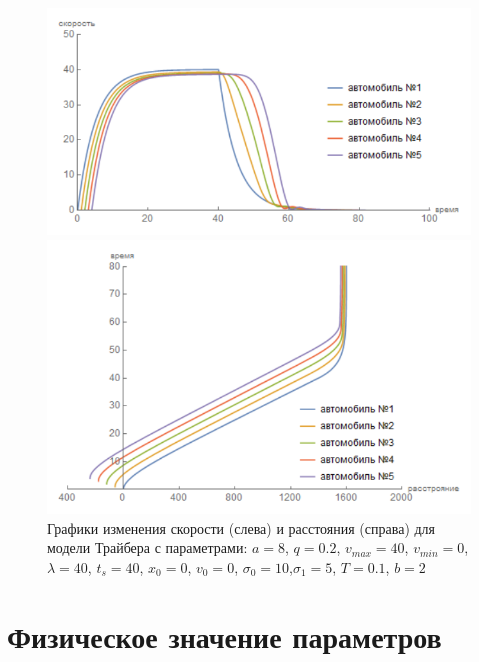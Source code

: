 \documentclass[12pt, a4paper]{extarticle}
\numberwithin{equation}{section}
\begin{document}
\begin{figure}[h!]
	\begin{center}
		\begin{minipage}[h!]{0.48\linewidth}
			\includegraphics[width=1\linewidth,height=0.2\textheight]
			{Images/treiber_model_speed.png}
		\end{minipage}
		\hfill 
		\begin{minipage}[h!]{0.48\linewidth}
			\includegraphics[width=1\linewidth,height=0.2\textheight]
			{Images/treiber_model_distance.png}
		\end{minipage}
		\caption{Графики изменения скорости (слева) и расстояния (справа) для модели Трайбера с параметрами: $a=8$, $q=0.2$, $v_{max}=40$, $v_{min}=0$, $\lambda=40$, $t_s=40$, $x_0=0$, $v_0=0$, $\sigma_0=10$,$\sigma_1=5$, $T=0.1$, $b=2$ }
		\label{treiber_model_img}
	\end{center}
\end{figure}

\section{Физическое значение параметров} 
\end{document}
